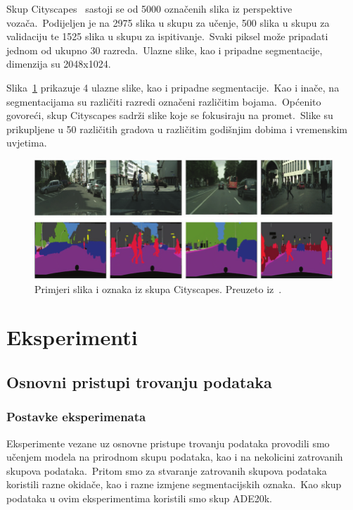 \documentclass[times, utf8, seminar, numeric]{fer}
\begin{document}
Skup Cityscapes~\cite{cordts2016cityscapes} sastoji se od 5000 označenih slika iz perspektive vozača.\ 
Podijeljen je na 2975 slika u skupu za učenje, 500 slika u skupu za validaciju te 1525 slika u skupu za ispitivanje.\ Svaki piksel može pripadati jednom od ukupno 30 razreda.\ 
Ulazne slike, kao i pripadne segmentacije, dimenzija su 2048x1024.\ 
  
Slika~\ref{fig:cityscapes} prikazuje 4 ulazne slike, kao i pripadne segmentacije.\ 
Kao i inače, na segmentacijama su različiti razredi označeni različitim bojama.\ 
Općenito govoreći, skup Cityscapes sadrži slike koje se fokusiraju na promet.\ 
Slike su prikupljene u 50 različitih gradova u različitim godišnjim dobima i vremenskim uvjetima.\ 

\begin{figure}[h]
    \centering
    \includegraphics[scale=0.45]{./Slike/cityscapes.png}
    \caption{Primjeri slika i oznaka iz skupa Cityscapes. Preuzeto iz~\cite{rafique2022cnn}.}
    \label{fig:cityscapes}
\end{figure}

\chapter{Eksperimenti}

\section{Osnovni pristupi trovanju podataka}

\subsection{Postavke eksperimenata}

Eksperimente vezane uz osnovne pristupe trovanju podataka provodili smo učenjem modela na prirodnom skupu podataka, kao i na nekolicini zatrovanih skupova podataka.\ 
Pritom smo za stvaranje zatrovanih skupova podataka koristili razne okidače, kao i razne izmjene segmentacijskih oznaka.\ Kao skup podataka u ovim eksperimentima koristili smo skup ADE20k.\ 
  
\end{document}

